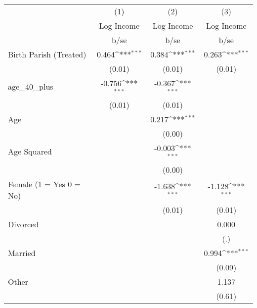 {
\def\sym#1{\ifmmode^{#1}\else\(^{#1}\)\fi}
\begin{tabular}{l*{3}{c}}
\hline\hline
                    &\multicolumn{1}{c}{(1)}&\multicolumn{1}{c}{(2)}&\multicolumn{1}{c}{(3)}\\
                    &\multicolumn{1}{c}{Log Income}&\multicolumn{1}{c}{Log Income}&\multicolumn{1}{c}{Log Income}\\
                    &        b/se         &        b/se         &        b/se         \\
\hline
Birth Parish (Treated)&       0.464\sym{***}&       0.384\sym{***}&       0.263\sym{***}\\
                    &      (0.01)         &      (0.01)         &      (0.01)         \\
age\_40\_plus         &      -0.756\sym{***}&      -0.367\sym{***}&                     \\
                    &      (0.01)         &      (0.01)         &                     \\
Age                 &                     &       0.217\sym{***}&                     \\
                    &                     &      (0.00)         &                     \\
Age Squared         &                     &      -0.003\sym{***}&                     \\
                    &                     &      (0.00)         &                     \\
Female (1 = Yes 0 = No)&                     &      -1.638\sym{***}&      -1.128\sym{***}\\
                    &                     &      (0.01)         &      (0.01)         \\
Divorced            &                     &                     &       0.000         \\
                    &                     &                     &         (.)         \\
Married             &                     &                     &       0.994\sym{***}\\
                    &                     &                     &      (0.09)         \\
Other               &                     &                     &       1.137         \\
                    &                     &                     &      (0.61)         \\

\end{tabular}}
